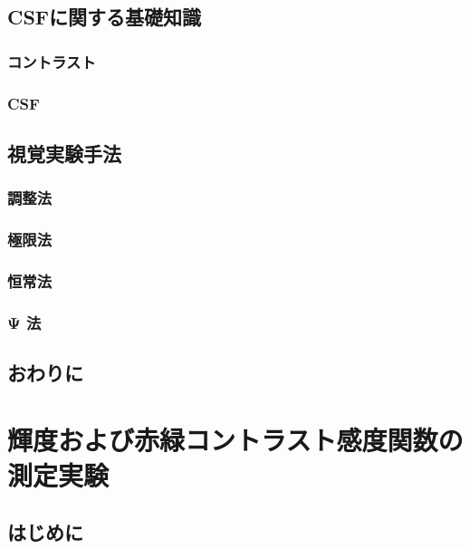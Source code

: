 \documentclass[11pt,oneside,openany,report]{jsbook}
\begin{document}
  \section{CSFに関する基礎知識}

    \subsection{コントラスト}

    \subsection{CSF}

  \section{視覚実験手法}

    \subsection{調整法}

    \subsection{極限法}

    \subsection{恒常法}

    \subsection{Ψ 法}

  \section{おわりに}


\chapter{輝度および赤緑コントラスト感度関数の測定実験}

  \section{はじめに}
\end{document}
